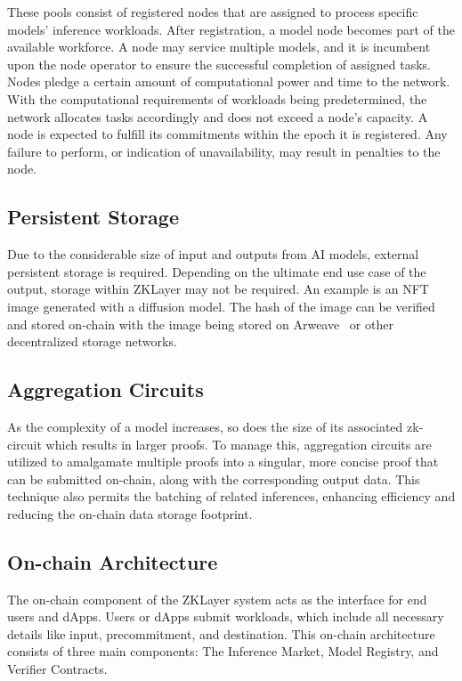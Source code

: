 \documentclass[conference]{IEEEtran}
\begin{document}
These pools consist of registered nodes that are assigned to process specific models' inference workloads. After registration, a model node becomes part of the available workforce. A node may service multiple models, and it is incumbent upon the node operator to ensure the successful completion of assigned tasks. Nodes pledge a certain amount of computational power and time to the network. With the computational requirements of workloads being predetermined, the network allocates tasks accordingly and does not exceed a node's capacity. A node is expected to fulfill its commitments within the epoch it is registered. Any failure to perform, or indication of unavailability, may result in penalties to the node.


\subsection{Persistent Storage}

Due to the considerable size of input and outputs from AI models, external persistent storage is required. Depending on the ultimate end use case of the output, storage within ZKLayer may not be required. An example is an NFT image generated with a diffusion model. The hash of the image can be verified and stored on-chain with the image being stored on Arweave~\cite{Arweave} or other decentralized storage networks.


\subsection{Aggregation Circuits}

As the complexity of a model increases, so does the size of its associated zk-circuit which results in larger proofs. To manage this, aggregation circuits are utilized to amalgamate multiple proofs into a singular, more concise proof that can be submitted on-chain, along with the corresponding output data. This technique also permits the batching of related inferences, enhancing efficiency and reducing the on-chain data storage footprint.

\subsection{On-chain Architecture}

The on-chain component of the ZKLayer system acts as the interface for end users and dApps.  Users or dApps submit workloads, which include all necessary details like input, precommitment, and destination. This on-chain architecture consists of three main components: The Inference Market, Model Registry, and Verifier Contracts.
\end{document}

